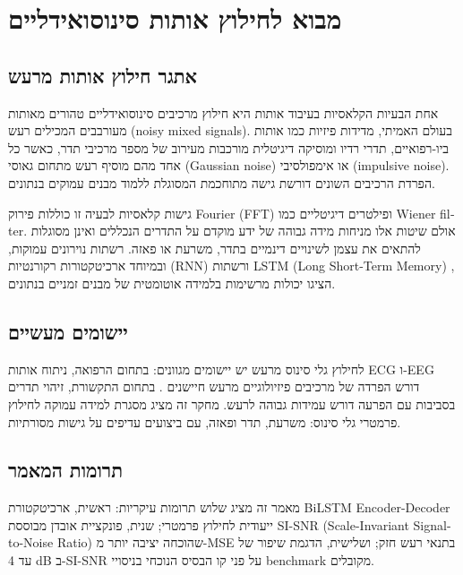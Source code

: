 
\chapter{מבוא לחילוץ אותות סינוסואידליים}

\section{אתגר חילוץ אותות מרעש}

אחת הבעיות הקלאסיות בעיבוד אותות היא חילוץ מרכיבים סינוסואידליים טהורים מאותות מעורבבים המכילים רעש (\textenglish{noisy mixed signals}). בעולם האמיתי, מדידות פיזיות כמו אותות ביו-רפואיים, תדרי רדיו ומוסיקה דיגיטלית מורכבות מעירוב של מספר מרכיבי תדר, כאשר כל אחד מהם מוסיף רעש מתחום גאוסי (\textenglish{Gaussian noise}) או אימפולסיבי (\textenglish{impulsive noise}). הפרדת הרכיבים השונים דורשת גישה מתוחכמת המסוגלת ללמוד מבנים עמוקים בנתונים.

גישות קלאסיות לבעיה זו כוללות פירוק \textenglish{Fourier} (\textenglish{FFT}) ופילטרים דיגיטליים כמו \textenglish{Wiener filter}. אולם שיטות אלו מניחות מידה גבוהה של ידע מוקדם על התדרים הנכללים ואינן מסוגלות להתאים את עצמן לשינויים דינמיים בתדר, משרעת או פאזה. רשתות נוירונים עמוקות, ובמיוחד ארכיטקטורות רקורנטיות (\textenglish{RNN}) ורשתות \textenglish{LSTM} (\textenglish{Long Short-Term Memory}) \cite{hochreiter1997lstm}, הציגו יכולות מרשימות בלמידה אוטומטית של מבנים זמניים בנתונים.

\section{יישומים מעשיים}

לחילוץ גלי סינוס מרעש יש יישומים מגוונים: בתחום הרפואה, ניתוח אותות \textenglish{ECG} ו-\textenglish{EEG} דורש הפרדה של מרכיבים פיזיולוגיים מרעש חיישנים \cite{valentini2019speech}. בתחום התקשורת, זיהוי תדרים בסביבות עם הפרעה דורש עמידות גבוהה לרעש. מחקר זה מציג מסגרת למידה עמוקה לחילוץ פרמטרי גלי סינוס: משרעת, תדר ופאזה, עם ביצועים עדיפים על גישות מסורתיות.

\section{תרומות המאמר}

מאמר זה מציג שלוש תרומות עיקריות: ראשית, ארכיטקטורת \textenglish{BiLSTM Encoder-Decoder} ייעודית לחילוץ פרמטרי; שנית, פונקציית אובדן מבוססת \textenglish{SI-SNR} (\textenglish{Scale-Invariant Signal-to-Noise Ratio}) שהוכחה יציבה יותר מ-\textenglish{MSE} בתנאי רעש חזק; ושלישית, הדגמת שיפור של עד \textenglish{4 dB} ב-\textenglish{SI-SNR} על פני קו הבסיס הנוכחי \cite{luo2019convtasnet} בניסויי \textenglish{benchmark} מקובלים.
